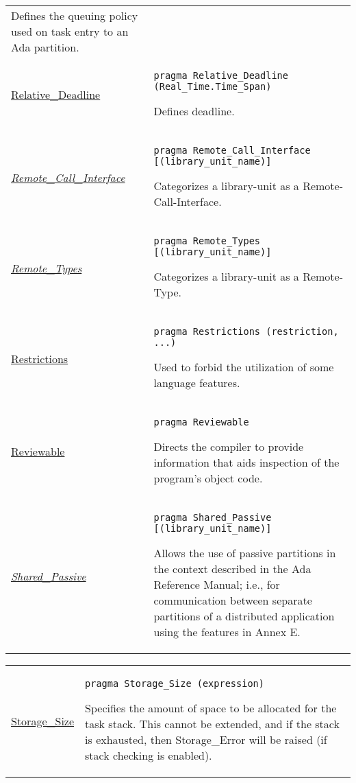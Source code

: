 \documentclass[english]{article}
\begin{document}
\begin{scriptsize}
\begin{multicols*}{3}
\begin{tabular}{@{}p{2cm}p{6.5cm}}
Defines the queuing policy used on task entry to an Ada partition.\\

\href{http://www.ada-auth.org/standards/22rm/html/RM-J-15-12.html}{Relative\_Deadline} & \texttt{pragma Relative\_Deadline (Real\_Time.Time\_Span)}

Defines deadline.\\

\href{http://www.ada-auth.org/standards/22rm/html/RM-J-15-15.html}{\textit{Remote\_Call\_Interface}} & \texttt{pragma Remote\_Call\_Interface [(library\_unit\_name)]}

Categorizes a library-unit as a Remote-Call-Interface.\\

\href{http://www.ada-auth.org/standards/22rm/html/RM-J-15-15.html}{\textit{Remote\_Types}} & \texttt{pragma Remote\_Types [(library\_unit\_name)]}

Categorizes a library-unit as a Remote-Type.\\

\href{http://www.ada-auth.org/standards/22rm/html/RM-13-12.html}{Restrictions} & \texttt{pragma Restrictions (restriction{, ...})}

Used to forbid the utilization of some language features.\\


\href{http://www.ada-auth.org/standards/22rm/html/RM-H-3-1.html}{Reviewable} & \texttt{pragma Reviewable}

Directs the compiler to provide information that aids inspection of the program's object code.\\

\href{http://www.ada-auth.org/standards/22rm/html/RM-J-15-15.html}{\textit{Shared\_Passive}} & \texttt{pragma Shared\_Passive [(library\_unit\_name)]}

Allows the use of passive partitions in the context described in the Ada Reference Manual; i.e., for communication between separate partitions of a distributed application using the features in Annex E.\\

\end{tabular}
\begin{tabular}{@{}p{2cm}p{6.5cm}}

\href{http://www.ada-auth.org/standards/22rm/html/RM-J-15-4.html}{Storage\_Size} & \texttt{pragma Storage\_Size (expression)}

   Specifies the amount of space to be allocated for the task stack. This cannot be extended, and if the stack is exhausted, then Storage\_Error will be raised (if stack checking is enabled).\\


\end{tabular}
\end{multicols*}
\end{scriptsize}
\end{document}
